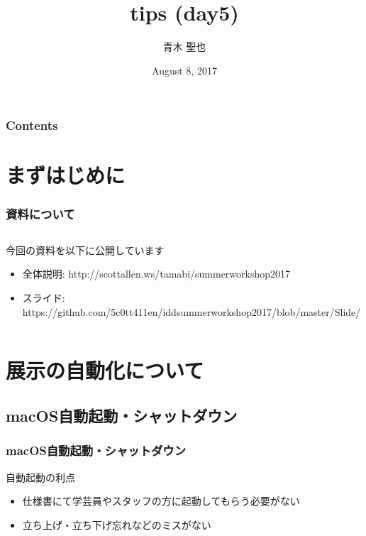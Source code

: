 \documentclass[10pt, dvipdfmx]{beamer}
\title{tips (day5)}
\author{青木 聖也}
\institute[所属]{多摩美術大学情報デザイン研究室}
\date{August 8, 2017}
\begin{document}
    \begin{frame}[plain]
        \frametitle{}
	    \titlepage
    \end{frame}

    \begin{frame}
        \frametitle{Contents}
        \tableofcontents
    \end{frame}

    \section{まずはじめに}
        \begin{frame}
            \frametitle{資料について}
            \begin{columns}[c]
                \begin{column}{0.80\textwidth}
                    \begin{block}{今回の資料を以下に公開しています}
                        \begin{itemize}
                            \scriptsize
                            \item 全体説明: http://scottallen.ws/tamabi/summerworkshop2017
                            \item スライド: https://github.com/5c0tt411en/iddsummerworkshop2017/blob/master/Slide/
                        \end{itemize}
                    \end{block}
                \end{column}
            \end{columns}
        \end{frame}

    \section{展示の自動化について}
    \subsection{macOS自動起動・シャットダウン}
        \begin{frame}
            \frametitle{macOS自動起動・シャットダウン}
            \begin{block}{自動起動の利点}
                \begin{itemize}
                    \item 仕様書にて学芸員やスタッフの方に起動してもらう必要がない
                    \item 立ち上げ・立ち下げ忘れなどのミスがない
                \end{itemize}
            \end{block}
        \end{frame}
\end{document}

